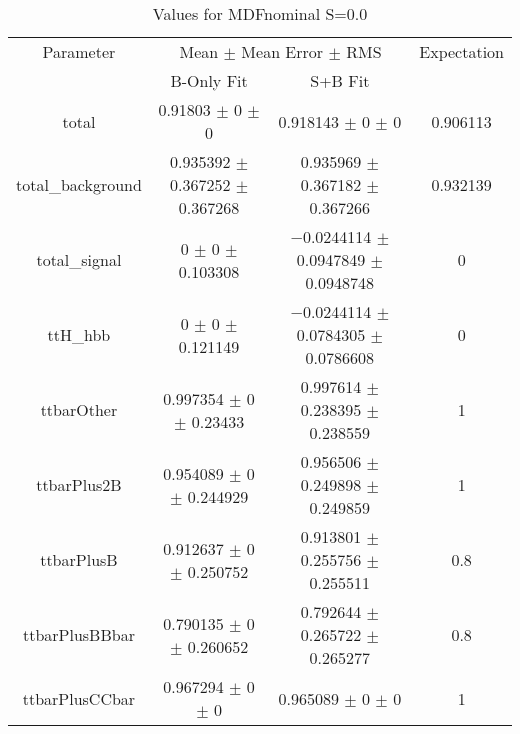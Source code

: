 \begin{table}
\centering
\caption{Values for MDFnominal S=0.0}
\begin{tabular}{cccc}
\toprule
Parameter & \multicolumn{2}{c}{Mean $\pm$ Mean Error $\pm$ RMS} & Expectation\\
 & B-Only Fit & S+B Fit & \\
\midrule
total & \num{0.91803} $\pm$ \num{0} $\pm$ \num{0} & \num{0.918143} $\pm$ \num{0} $\pm$ \num{0} & \num{0.906113}\\
total\_background & \num{0.935392} $\pm$ \num{0.367252} $\pm$ \num{0.367268} & \num{0.935969} $\pm$ \num{0.367182} $\pm$ \num{0.367266} & \num{0.932139}\\
total\_signal & \num{0} $\pm$ \num{0} $\pm$ \num{0.103308} & \num{-0.0244114} $\pm$ \num{0.0947849} $\pm$ \num{0.0948748} & \num{0}\\
ttH\_hbb & \num{0} $\pm$ \num{0} $\pm$ \num{0.121149} & \num{-0.0244114} $\pm$ \num{0.0784305} $\pm$ \num{0.0786608} & \num{0}\\
ttbarOther & \num{0.997354} $\pm$ \num{0} $\pm$ \num{0.23433} & \num{0.997614} $\pm$ \num{0.238395} $\pm$ \num{0.238559} & \num{1}\\
ttbarPlus2B & \num{0.954089} $\pm$ \num{0} $\pm$ \num{0.244929} & \num{0.956506} $\pm$ \num{0.249898} $\pm$ \num{0.249859} & \num{1}\\
ttbarPlusB & \num{0.912637} $\pm$ \num{0} $\pm$ \num{0.250752} & \num{0.913801} $\pm$ \num{0.255756} $\pm$ \num{0.255511} & \num{0.8}\\
ttbarPlusBBbar & \num{0.790135} $\pm$ \num{0} $\pm$ \num{0.260652} & \num{0.792644} $\pm$ \num{0.265722} $\pm$ \num{0.265277} & \num{0.8}\\
ttbarPlusCCbar & \num{0.967294} $\pm$ \num{0} $\pm$ \num{0} & \num{0.965089} $\pm$ \num{0} $\pm$ \num{0} & \num{1}\\
\bottomrule
\end{tabular}
\end{table}